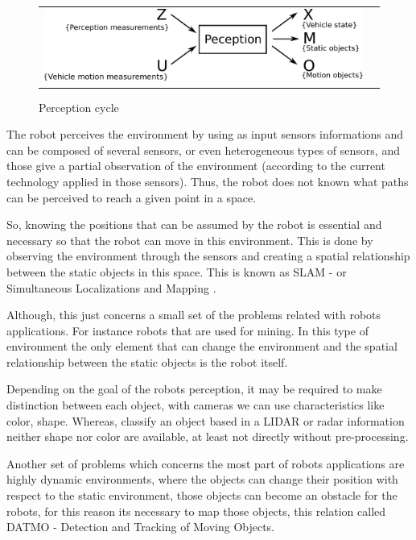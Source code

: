 \begin{figure}[h]
   \centering
     \begin{tabular}{lr}
       \includegraphics[scale=0.5]{img/fig:perception:cycle}
     \end{tabular}
   \caption{Perception cycle}
   \label{fig:perception:cycle}
 \end{figure}


The robot perceives the environment by using as input sensors informations and can be composed of several sensors, or even heterogeneous types of sensors, and those give a partial observation of the environment (according to the current technology applied in those sensors). Thus, the robot does not known what paths can be perceived to reach a given point in a space.

So, knowing the positions that can be assumed by the robot is essential and necessary so that the robot can move in this environment. This is done by observing the environment through the sensors and creating a spatial relationship between the static objects in this space. This is known as SLAM - or Simultaneous Localizations and Mapping \cite{iyengar1991autonomous}.

Although, this just concerns a small set of the problems related with robots applications. For instance robots that are used for mining. In this type of environment the only element that can change the environment and the spatial relationship between the static objects is the robot itself. 

Depending on the goal of the robots perception, it may be required to make distinction between each object, with cameras we can use characteristics like color, shape. Whereas, classify an object based in a LIDAR or radar information neither shape nor color are available, at least not directly without pre-processing.

Another set of problems which concerns the most part of robots applications are highly dynamic environments, where the objects can change their position with respect to the static environment, those objects can become an obstacle for the robots, for this reason its necessary to map those objects, this relation called DATMO - Detection and Tracking of Moving Objects.


